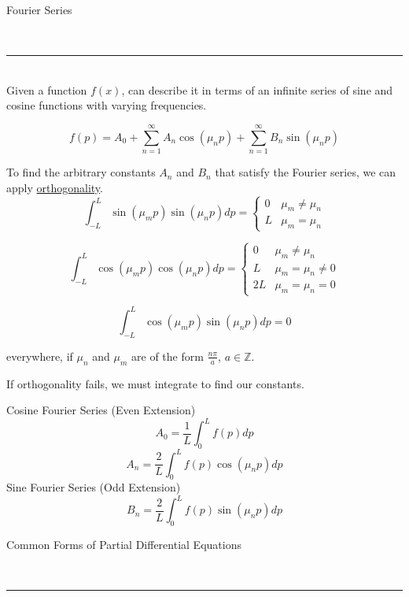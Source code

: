 \documentclass{article}
\begin{document}
\begin{large}
    \noindent Fourier Series
\end{large}\\
\rule{\textwidth}{0.5pt}\smallskip\\

\noindent Given a function $f(x)$, can describe it in terms of an infinite series of sine and cosine functions with varying frequencies.

\[
    f(p) = A_0 + \sum_{n=1}^\infty{A_n\cos(\mu_n p)} + \sum_{n=1}^\infty{B_n \sin(\mu_n p)}
\]

\begin{multicols}{2}
\noindent To find the arbitrary constants $A_n$ and $B_n$ that satisfy the Fourier series, we can apply \underline{orthogonality}.
    \[
    \int_{-L}^L{\sin(\mu_m p)\sin(\mu_n p)dp = 
    \begin{cases}
        0 & \mu_m \neq \mu_n \\
        L & \mu_m = \mu_n
    \end{cases}}
    \]
    
    \[
    \int_{-L}^L{\cos(\mu_m p)\cos(\mu_n p)dp = 
    \begin{cases}
        0 & \mu_m \neq \mu_n \\
        L & \mu_m = \mu_n \neq 0 \\
        2L & \mu_m = \mu_n = 0
    \end{cases}}
    \]
    
    \[
        \int_{-L}^L{\cos(\mu_m p)\sin(\mu_n p)dp} = 0
    \]
    
    \small everywhere, if $\mu_n$ and $\mu_m$ are of the form $\frac{n \pi}{a}$, $a \in \mathbb{Z}$.
    
    \columnbreak
    
    \normalsize
    \noindent If orthogonality fails, we must integrate to find our constants.
    \medskip
    
    \centering Cosine Fourier Series (Even Extension)
    \[
        A_0 = \frac{1}{L} \int_0^Lf(p)dp
    \]
    \[
        A_n = \frac{2}{L}\int_0^L f(p) \cos(\mu_n p)dp
    \]
    Sine Fourier Series (Odd Extension)
    \[
        B_n = \frac{2}{L} \int_0^L f(p) \sin(\mu_n p)dp
    \]
\end{multicols}

\pagebreak
\begin{large}
    \noindent Common Forms of Partial Differential Equations
\end{large}\\
\rule{\textwidth}{0.5pt}\smallskip\\
\end{document}
